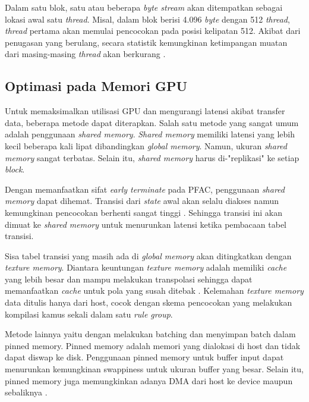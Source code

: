 \documentclass[conference]{IEEEtran}
\begin{document}
        Dalam satu blok, satu atau beberapa \emph{byte stream} akan ditempatkan sebagai lokasi awal satu \emph{thread}. Misal, dalam blok berisi 4.096 \emph{byte} dengan 512 \emph{thread}, \emph{thread} pertama akan memulai pencocokan pada posisi kelipatan 512. Akibat dari penugasan yang berulang, secara statistik kemungkinan ketimpangan muatan dari masing-masing \emph{thread} akan berkurang \cite{lin2013}. 

    \subsection{Optimasi pada Memori GPU}
        Untuk memaksimalkan utilisasi GPU dan mengurangi latensi akibat transfer data, beberapa metode dapat diterapkan. Salah satu metode yang sangat umum adalah penggunaan \emph{shared memory}. \emph{Shared memory} memiliki latensi yang lebih kecil beberapa kali lipat dibandingkan \emph{global memory}. Namun, ukuran \emph{shared memory} sangat terbatas. Selain itu, \emph{shared memory} harus di-"replikasi" ke setiap \emph{block}. 

        Dengan memanfaatkan sifat \emph{early terminate} pada PFAC, penggunaan \emph{shared memory} dapat dihemat. Transisi dari \emph{state} awal akan selalu diakses namun kemungkinan pencocokan berhenti sangat tinggi \cite{lin2013}. Sehingga transisi ini akan dimuat ke \emph{shared memory} untuk menurunkan latensi ketika pembacaan tabel transisi.


        Sisa tabel transisi yang masih ada di \emph{global memory} akan ditingkatkan dengan \emph{texture memory}. Diantara keuntungan \emph{texture memory} adalah memiliki \emph{cache} yang lebih besar dan mampu melakukan transpolasi sehingga dapat memanfaatkan \emph{cache} untuk pola yang susah ditebak \cite{lin2013}. Kelemahan \emph{texture memory} data ditulis hanya dari host, cocok dengan skema pencocokan yang melakukan kompilasi kamus sekali dalam satu \emph{rule group}.

        Metode lainnya yaitu dengan melakukan batching dan menyimpan batch dalam pinned memory. Pinned memory adalah memori yang dialokasi di host dan tidak dapat diswap ke disk. Penggunaan pinned memory untuk buffer input dapat menurunkan kemungkinan swappiness untuk ukuran buffer yang besar. Selain itu, pinned memory juga memungkinkan adanya DMA dari host ke device maupun sebaliknya \cite{gnort2008}.

\end{document}
